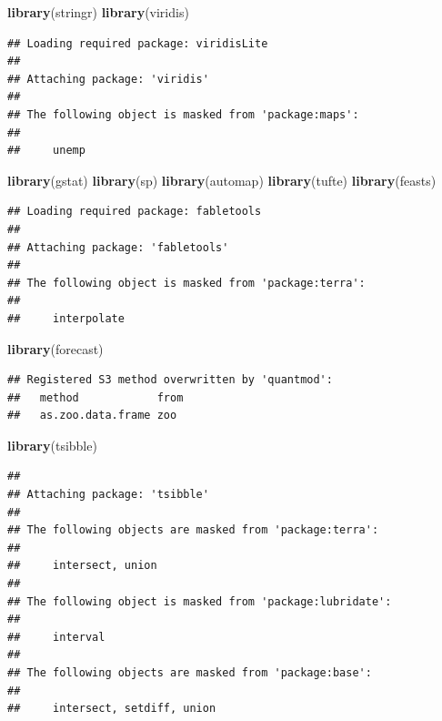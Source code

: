 \documentclass[
]{article}
\newenvironment{Shaded}{\begin{snugshade}}{\end{snugshade}}
\newcommand{\FunctionTok}[1]{\textcolor[rgb]{0.13,0.29,0.53}{\textbf{#1}}}
\newcommand{\NormalTok}[1]{#1}
\begin{document}
\begin{Shaded}
\begin{Highlighting}[]
\FunctionTok{library}\NormalTok{(stringr)}
\FunctionTok{library}\NormalTok{(viridis)}
\end{Highlighting}
\end{Shaded}

\begin{verbatim}
## Loading required package: viridisLite
## 
## Attaching package: 'viridis'
## 
## The following object is masked from 'package:maps':
## 
##     unemp
\end{verbatim}

\begin{Shaded}
\begin{Highlighting}[]
\FunctionTok{library}\NormalTok{(gstat)}
\FunctionTok{library}\NormalTok{(sp)}
\FunctionTok{library}\NormalTok{(automap)}
\FunctionTok{library}\NormalTok{(tufte)}
\FunctionTok{library}\NormalTok{(feasts)}
\end{Highlighting}
\end{Shaded}

\begin{verbatim}
## Loading required package: fabletools
## 
## Attaching package: 'fabletools'
## 
## The following object is masked from 'package:terra':
## 
##     interpolate
\end{verbatim}

\begin{Shaded}
\begin{Highlighting}[]
\FunctionTok{library}\NormalTok{(forecast)}
\end{Highlighting}
\end{Shaded}

\begin{verbatim}
## Registered S3 method overwritten by 'quantmod':
##   method            from
##   as.zoo.data.frame zoo
\end{verbatim}

\begin{Shaded}
\begin{Highlighting}[]
\FunctionTok{library}\NormalTok{(tsibble)}
\end{Highlighting}
\end{Shaded}

\begin{verbatim}
## 
## Attaching package: 'tsibble'
## 
## The following objects are masked from 'package:terra':
## 
##     intersect, union
## 
## The following object is masked from 'package:lubridate':
## 
##     interval
## 
## The following objects are masked from 'package:base':
## 
##     intersect, setdiff, union
\end{verbatim}
\end{document}
